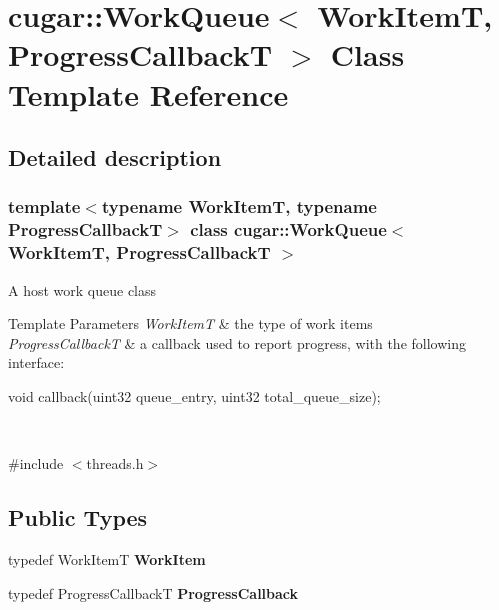 \hypertarget{classcugar_1_1_work_queue}{}\section{cugar\+:\+:Work\+Queue$<$ Work\+ItemT, Progress\+CallbackT $>$ Class Template Reference}
\label{classcugar_1_1_work_queue}


\subsection{Detailed description}
\subsubsection*{template$<$typename Work\+ItemT, typename Progress\+CallbackT$>$\newline
class cugar\+::\+Work\+Queue$<$ Work\+Item\+T, Progress\+Callback\+T $>$}

A host work queue class


\begin{DoxyTemplParams}{Template Parameters}
{\em Work\+ItemT} & the type of work items \\
\hline
{\em Progress\+CallbackT} & a callback used to report progress, with the following interface\+: 
\begin{DoxyCode}
\textcolor{keywordtype}{void} callback(uint32 queue\_entry, uint32 total\_queue\_size);
\end{DoxyCode}
 \\
\hline
\end{DoxyTemplParams}


{\ttfamily \#include $<$threads.\+h$>$}

\subsection*{Public Types}
\begin{DoxyCompactItemize}
\item 
\mbox{\label{classcugar_1_1_work_queue_a986b0aa05ad206295ec982e6df38ac23}} 
typedef Work\+ItemT {\bfseries Work\+Item}
\item 
\mbox{\label{classcugar_1_1_work_queue_ad69e364a8ebe7e0d536288502f5c1d5f}} 
typedef Progress\+CallbackT {\bfseries Progress\+Callback}
\end{DoxyCompactItemize}
